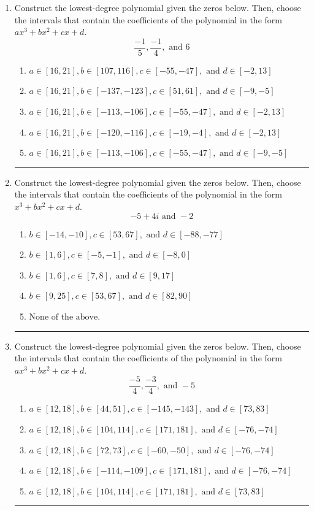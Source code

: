 \documentclass[14pt]{extbook}
\newcommand{\litem}[1]{\item#1\hspace*{-1cm}\rule{\textwidth}{0.4pt}}
\begin{document}
\begin{enumerate}
\litem{
Construct the lowest-degree polynomial given the zeros below. Then, choose the intervals that contain the coefficients of the polynomial in the form $ax^3+bx^2+cx+d$.\[ \frac{-1}{5}, \frac{-1}{4}, \text{ and } 6 \]\begin{enumerate}[label=\Alph*.]
\item \( a \in [16, 21], b \in [107, 116], c \in [-55, -47], \text{ and } d \in [-2, 13] \)
\item \( a \in [16, 21], b \in [-137, -123], c \in [51, 61], \text{ and } d \in [-9, -5] \)
\item \( a \in [16, 21], b \in [-113, -106], c \in [-55, -47], \text{ and } d \in [-2, 13] \)
\item \( a \in [16, 21], b \in [-120, -116], c \in [-19, -4], \text{ and } d \in [-2, 13] \)
\item \( a \in [16, 21], b \in [-113, -106], c \in [-55, -47], \text{ and } d \in [-9, -5] \)

\end{enumerate} }
\litem{
Construct the lowest-degree polynomial given the zeros below. Then, choose the intervals that contain the coefficients of the polynomial in the form $x^3+bx^2+cx+d$.\[ -5 + 4 i \text{ and } -2 \]\begin{enumerate}[label=\Alph*.]
\item \( b \in [-14, -10], c \in [53, 67], \text{ and } d \in [-88, -77] \)
\item \( b \in [1, 6], c \in [-5, -1], \text{ and } d \in [-8, 0] \)
\item \( b \in [1, 6], c \in [7, 8], \text{ and } d \in [9, 17] \)
\item \( b \in [9, 25], c \in [53, 67], \text{ and } d \in [82, 90] \)
\item \( \text{None of the above.} \)

\end{enumerate} }
\litem{
Construct the lowest-degree polynomial given the zeros below. Then, choose the intervals that contain the coefficients of the polynomial in the form $ax^3+bx^2+cx+d$.\[ \frac{-5}{4}, \frac{-3}{4}, \text{ and } -5 \]\begin{enumerate}[label=\Alph*.]
\item \( a \in [12, 18], b \in [44, 51], c \in [-145, -143], \text{ and } d \in [73, 83] \)
\item \( a \in [12, 18], b \in [104, 114], c \in [171, 181], \text{ and } d \in [-76, -74] \)
\item \( a \in [12, 18], b \in [72, 73], c \in [-60, -50], \text{ and } d \in [-76, -74] \)
\item \( a \in [12, 18], b \in [-114, -109], c \in [171, 181], \text{ and } d \in [-76, -74] \)
\item \( a \in [12, 18], b \in [104, 114], c \in [171, 181], \text{ and } d \in [73, 83] \)

\end{enumerate} }
\end{enumerate}
\end{document}
